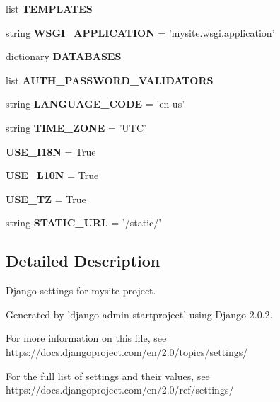 \begin{DoxyCompactItemize}
\item 
list {\bfseries T\-E\-M\-P\-L\-A\-T\-E\-S}
\item 
\hypertarget{namespacemysite_1_1settings_a7e476bde6438ad8065a7d9f5b4a759ba}{string {\bfseries W\-S\-G\-I\-\_\-\-A\-P\-P\-L\-I\-C\-A\-T\-I\-O\-N} = 'mysite.\-wsgi.\-application'}\label{namespacemysite_1_1settings_a7e476bde6438ad8065a7d9f5b4a759ba}

\item 
dictionary {\bfseries D\-A\-T\-A\-B\-A\-S\-E\-S}
\item 
list {\bfseries A\-U\-T\-H\-\_\-\-P\-A\-S\-S\-W\-O\-R\-D\-\_\-\-V\-A\-L\-I\-D\-A\-T\-O\-R\-S}
\item 
\hypertarget{namespacemysite_1_1settings_a5aa2d89c65baaf7b41e64a82ed412029}{string {\bfseries L\-A\-N\-G\-U\-A\-G\-E\-\_\-\-C\-O\-D\-E} = 'en-\/us'}\label{namespacemysite_1_1settings_a5aa2d89c65baaf7b41e64a82ed412029}

\item 
\hypertarget{namespacemysite_1_1settings_a8166ffe52ad58ff798949b613c9b5b2c}{string {\bfseries T\-I\-M\-E\-\_\-\-Z\-O\-N\-E} = 'U\-T\-C'}\label{namespacemysite_1_1settings_a8166ffe52ad58ff798949b613c9b5b2c}

\item 
\hypertarget{namespacemysite_1_1settings_af3b43f8f116e73ded7f3ce336e7499ac}{{\bfseries U\-S\-E\-\_\-\-I18\-N} = True}\label{namespacemysite_1_1settings_af3b43f8f116e73ded7f3ce336e7499ac}

\item 
\hypertarget{namespacemysite_1_1settings_abaf7e237dddf19bbdecee0f0167c2e06}{{\bfseries U\-S\-E\-\_\-\-L10\-N} = True}\label{namespacemysite_1_1settings_abaf7e237dddf19bbdecee0f0167c2e06}

\item 
\hypertarget{namespacemysite_1_1settings_a58cd46ff574d992b401f49fd371e0b24}{{\bfseries U\-S\-E\-\_\-\-T\-Z} = True}\label{namespacemysite_1_1settings_a58cd46ff574d992b401f49fd371e0b24}

\item 
\hypertarget{namespacemysite_1_1settings_a2aa5b2f0ed54dd3f8965ca2786f7fc27}{string {\bfseries S\-T\-A\-T\-I\-C\-\_\-\-U\-R\-L} = '/static/'}\label{namespacemysite_1_1settings_a2aa5b2f0ed54dd3f8965ca2786f7fc27}

\end{DoxyCompactItemize}


\subsection{Detailed Description}
\begin{DoxyVerb}Django settings for mysite project.

Generated by 'django-admin startproject' using Django 2.0.2.

For more information on this file, see
https://docs.djangoproject.com/en/2.0/topics/settings/

For the full list of settings and their values, see
https://docs.djangoproject.com/en/2.0/ref/settings/
\end{DoxyVerb}
 

